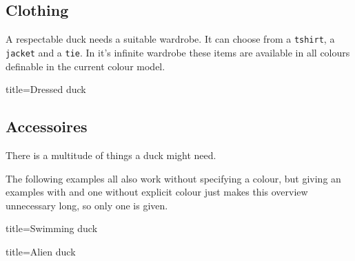 \documentclass[parskip=half]{scrartcl}
\begin{document}
\subsection{Clothing}

A respectable duck needs a suitable wardrobe. It can choose from a \lstinline|tshirt|, a \lstinline|jacket| and a \lstinline|tie|. In it's infinite wardrobe these items are available in all colours definable in the current colour model.

\begin{tcblisting}{title={Dressed duck}}
\begin{tikzpicture}
	\duck[tshirt]
\end{tikzpicture}
\begin{tikzpicture}
	\duck[jacket]
\end{tikzpicture}

\begin{tikzpicture}
	\duck[tie]
\end{tikzpicture}
\begin{tikzpicture}
	\duck[tshirt=lightgray, 
			jacket=blue!50!black, 
			tie=blue!80!black, 
			shorthair]
\end{tikzpicture}
\end{tcblisting}

\subsection{Accessoires}

There is a multitude of things a duck might need. 

The following examples all also work without specifying a colour, but giving an examples with and one without explicit colour just makes this overview unnecessary long, so only one is given.

\begin{tcblisting}{title={Swimming duck}}
\begin{tikzpicture}
	\duck[water=cyan!50!blue]
\end{tikzpicture}
\end{tcblisting}

\begin{tcblisting}{title={Alien duck}}
\begin{tikzpicture}
	\duck[alien=green!50!brown]
\end{tikzpicture}
\end{tcblisting}
\end{document}
